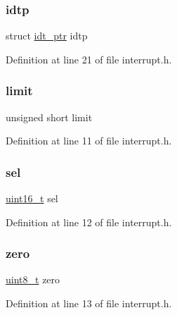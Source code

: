 \subsubsection{\texorpdfstring{idtp}{idtp}}
{\footnotesize\ttfamily struct \hyperlink{a00051}{idt\+\_\+ptr} idtp}



Definition at line 21 of file interrupt.\+h.

\mbox{\label{a00017_ab50c2dcb9d4a34ea1a5ac52272502379_ab50c2dcb9d4a34ea1a5ac52272502379}} 
\subsubsection{\texorpdfstring{limit}{limit}}
{\footnotesize\ttfamily unsigned short limit}



Definition at line 11 of file interrupt.\+h.

\mbox{\label{a00017_af0b0a7e10694e3b600c7561311cc8271_af0b0a7e10694e3b600c7561311cc8271}} 
\subsubsection{\texorpdfstring{sel}{sel}}
{\footnotesize\ttfamily \hyperlink{a00032_a273cf69d639a59973b6019625df33e30_a273cf69d639a59973b6019625df33e30}{uint16\+\_\+t} sel}



Definition at line 12 of file interrupt.\+h.

\mbox{\label{a00017_a09777e6a5ad91ffd82a9975efe33de2e_a09777e6a5ad91ffd82a9975efe33de2e}} 
\subsubsection{\texorpdfstring{zero}{zero}}
{\footnotesize\ttfamily \hyperlink{a00032_aba7bc1797add20fe3efdf37ced1182c5_aba7bc1797add20fe3efdf37ced1182c5}{uint8\+\_\+t} zero}



Definition at line 13 of file interrupt.\+h.

